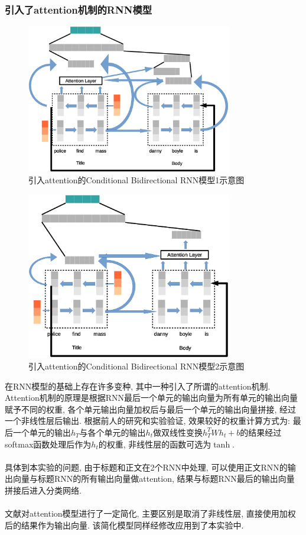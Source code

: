 \documentclass[a4paper]{article}
\begin{document}
	\subsubsection{引入了attention机制的RNN模型}
	\begin{figure}[H]
		\centering
		\includegraphics[width=0.8\textwidth]{att1.eps}
		\caption{引入attention的Conditional Bidirectional RNN模型1示意图}
		\label{att1}
	\end{figure}
	\begin{figure}[H]
		\centering
		\includegraphics[width=0.8\textwidth]{att2.eps}
		\caption{引入attention的Conditional Bidirectional RNN模型2示意图}
		\label{att2}
	\end{figure}
	在RNN模型的基础上存在许多变种, 其中一种引入了所谓的attention机制\cite{luong2015effective}. Attention机制的原理是根据RNN最后一个单元的输出向量为所有单元的输出向量赋予不同的权重, 各个单元输出向量加权后与最后一个单元的输出向量拼接, 经过一个非线性层后输出. 根据前人的研究和实验验证, 效果较好的权重计算方式为: 最后一个单元的输出$h_T$与各个单元的输出$h_t$做双线性变换$h_T^TWh_t+b$的结果经过softmax函数处理后作为$h_t$的权重, 非线性层的函数可选为$\tanh$.\\\\
	具体到本实验的问题, 由于标题和正文在2个RNN中处理, 可以使用正文RNN的输出向量与标题RNN的所有输出向量做attention, 结果与标题RNN最后的输出向量拼接后进入分类网络.\\\\
	文献\cite{chen2016thorough}对attention模型进行了一定简化, 主要区别是取消了非线性层, 直接使用加权后的结果作为输出向量. 该简化模型同样经修改应用到了本实验中.
	
\end{document}
